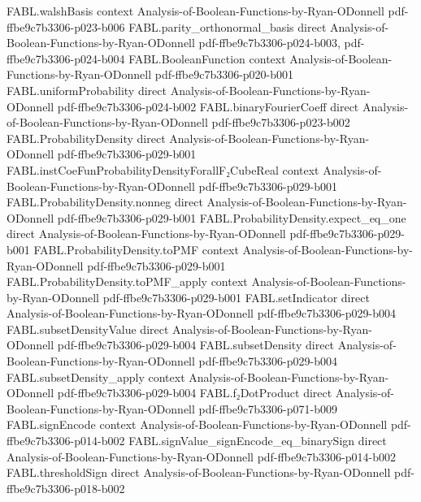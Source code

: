 \begin{theorem}
\proofstep
  {FABL.walshBasis}
  {context}
  {Analysis-of-Boolean-Functions-by-Ryan-ODonnell}
  {pdf-ffbe9c7b3306-p023-b006}
\proofstep
  {FABL.parity_orthonormal_basis}
  {direct}
  {Analysis-of-Boolean-Functions-by-Ryan-ODonnell}
  {pdf-ffbe9c7b3306-p024-b003,
    pdf-ffbe9c7b3306-p024-b004}
\proofstep
  {FABL.BooleanFunction}
  {context}
  {Analysis-of-Boolean-Functions-by-Ryan-ODonnell}
  {pdf-ffbe9c7b3306-p020-b001}
\proofstep
  {FABL.uniformProbability}
  {direct}
  {Analysis-of-Boolean-Functions-by-Ryan-ODonnell}
  {pdf-ffbe9c7b3306-p024-b002}
\proofstep
  {FABL.binaryFourierCoeff}
  {direct}
  {Analysis-of-Boolean-Functions-by-Ryan-ODonnell}
  {pdf-ffbe9c7b3306-p023-b002}
\proofstep
  {FABL.ProbabilityDensity}
  {direct}
  {Analysis-of-Boolean-Functions-by-Ryan-ODonnell}
  {pdf-ffbe9c7b3306-p029-b001}
\proofstep
  {FABL.instCoeFunProbabilityDensityForallF₂CubeReal}
  {context}
  {Analysis-of-Boolean-Functions-by-Ryan-ODonnell}
  {pdf-ffbe9c7b3306-p029-b001}
\proofstep
  {FABL.ProbabilityDensity.nonneg}
  {direct}
  {Analysis-of-Boolean-Functions-by-Ryan-ODonnell}
  {pdf-ffbe9c7b3306-p029-b001}
\proofstep
  {FABL.ProbabilityDensity.expect_eq_one}
  {direct}
  {Analysis-of-Boolean-Functions-by-Ryan-ODonnell}
  {pdf-ffbe9c7b3306-p029-b001}
\proofstep
  {FABL.ProbabilityDensity.toPMF}
  {context}
  {Analysis-of-Boolean-Functions-by-Ryan-ODonnell}
  {pdf-ffbe9c7b3306-p029-b001}
\proofstep
  {FABL.ProbabilityDensity.toPMF_apply}
  {context}
  {Analysis-of-Boolean-Functions-by-Ryan-ODonnell}
  {pdf-ffbe9c7b3306-p029-b001}
\proofstep
  {FABL.setIndicator}
  {direct}
  {Analysis-of-Boolean-Functions-by-Ryan-ODonnell}
  {pdf-ffbe9c7b3306-p029-b004}
\proofstep
  {FABL.subsetDensityValue}
  {direct}
  {Analysis-of-Boolean-Functions-by-Ryan-ODonnell}
  {pdf-ffbe9c7b3306-p029-b004}
\proofstep
  {FABL.subsetDensity}
  {direct}
  {Analysis-of-Boolean-Functions-by-Ryan-ODonnell}
  {pdf-ffbe9c7b3306-p029-b004}
\proofstep
  {FABL.subsetDensity_apply}
  {context}
  {Analysis-of-Boolean-Functions-by-Ryan-ODonnell}
  {pdf-ffbe9c7b3306-p029-b004}
\proofstep
  {FABL.f₂DotProduct}
  {direct}
  {Analysis-of-Boolean-Functions-by-Ryan-ODonnell}
  {pdf-ffbe9c7b3306-p071-b009}
\proofstep
  {FABL.signEncode}
  {context}
  {Analysis-of-Boolean-Functions-by-Ryan-ODonnell}
  {pdf-ffbe9c7b3306-p014-b002}
\proofstep
  {FABL.signValue_signEncode_eq_binarySign}
  {direct}
  {Analysis-of-Boolean-Functions-by-Ryan-ODonnell}
  {pdf-ffbe9c7b3306-p014-b002}
\proofstep
  {FABL.thresholdSign}
  {direct}
  {Analysis-of-Boolean-Functions-by-Ryan-ODonnell}
  {pdf-ffbe9c7b3306-p018-b002}
\proofstep

\end{theorem}
